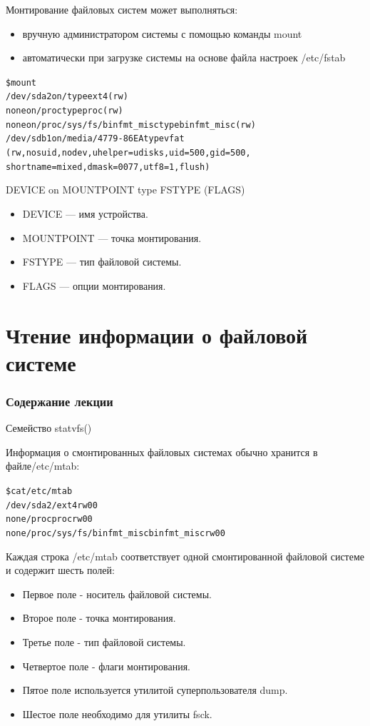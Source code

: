 \documentclass[xcolor=table]{beamer}
\begin{document}
\begin{frame}[fragile]
	\begin{block}{Монтирование файловых систем может выполняться:}		
		\begin{itemize}
			\item вручную администратором системы с помощью команды mount 
			\item автоматически при загрузке системы на основе файла настроек /etc/fstab		
		\end{itemize}
	\end{block}
	\begin{alltt}
		\$ mount
		/dev/sda2 on / type ext4 (rw)
		none on /proc type proc (rw)
		none on /proc/sys/fs/binfmt_misc type binfmt_misc (rw)
		/dev/sdb1 on /media/4779-86EA type vfat
		(rw,nosuid,nodev,uhelper=udisks,uid=500,gid=500,
		shortname=mixed,dmask=0077, utf8=1,flush)
	\end{alltt}
	DEVICE on MOUNTPOINT type FSTYPE (FLAGS)
	\begin{itemize}
		\item DEVICE — имя устройства.
		\item MOUNTPOINT — точка монтирования. 
		\item FSTYPE — тип файловой системы.
		\item FLAGS — опции монтирования. 
	\end{itemize}
\end{frame}

\section{Чтение информации о файловой системе}
\begin{frame}
  \frametitle{Содержание лекции}
  \tableofcontents[current]
\end{frame}

\begin{frame}[fragile]{Семейство statvfs()}
	\begin{block}{Информация о смонтированных файловых системах обычно хранится в файле/etc/mtab:}
		\begin{alltt}
			\$ cat /etc/mtab
			/dev/sda2 / ext4 rw 0 0
			none /proc proc rw 0 0
			none /proc/sys/fs/binfmt_misc binfmt_misc rw 0 0
		\end{alltt}
	\end{block}
	Каждая строка /etc/mtab соответствует одной смонтированной файловой системе и содержит шесть полей:
	\begin{itemize}
		\item Первое поле - носитель файловой системы.
		\item Второе поле - точка монтирования.
		\item Третье поле - тип файловой системы.
		\item Четвертое поле - флаги монтирования.
		\item Пятое поле используется утилитой суперпользователя dump.
		\item Шестое поле необходимо для утилиты fsck.
	\end{itemize}
\end{frame}
\end{document}
